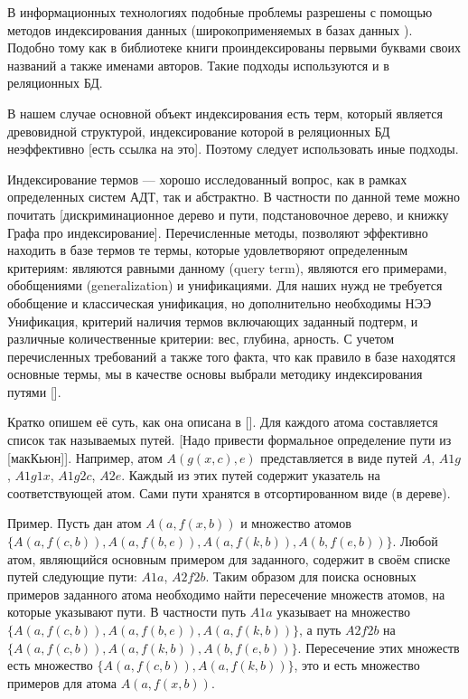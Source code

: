 В информационных технологиях подобные проблемы разрешены с помощью методов индексирования данных (широкоприменяемых в базах данных \cite{Ulman}). Подобно тому как в библиотеке книги проиндексированы первыми буквами своих названий а также именами авторов. Такие подходы используются и в реляционных БД.

В нашем случае основной объект индексирования есть терм, который является древовидной структурой, индексирование которой в реляционных БД неэффективно [есть ссылка на это]. Поэтому следует использовать иные подходы.

Индексирование термов --- хорошо исследованный вопрос, как в рамках определенных систем АДТ, так и абстрактно. В частности по данной теме можно почитать [дискриминационное дерево и пути, подстановочное дерево, и книжку Графа про индексирование].
Перечисленные методы, позволяют эффективно находить в базе термов те термы, которые удовлетворяют определенным критериям: являются равными данному (query term), являются его примерами, обобщениями (generalization) и унификациями.
Для наших нужд не требуется обобщение и классическая унификация, но дополнительно необходимы НЭЭ Унификация, критерий наличия термов включающих заданный подтерм, и различные количественные критерии: вес, глубина, арность. С учетом перечисленных требований а также того факта, что как правило в базе находятся основные термы, мы в качестве основы выбрали методику индексирования путями [].

Кратко опишем её суть, как она описана в []. Для каждого атома составляется список так называемых путей. [Надо привести формальное определение пути из [макКьюн]]. Например, атом $A(g(x,c),e)$ представляется в виде путей $A$, $A1g$, $A1g1x$, $A1g2c$, $A2e$. Каждый из этих путей содержит указатель на соответствующей атом. Сами пути хранятся в отсортированном виде (в дереве).

Пример. Пусть дан атом $A(a,f(x,b))$ и множество атомов $\{A(a,f(c,b)), A(a,f(b,e)),A(a,f(k,b)), A(b,f(e,b))\}$. Любой атом, являющийся основным примером для заданного, содержит в своём списке путей следующие пути: $A1a$, $A2f2b$. Таким образом для поиска основных примеров заданного атома необходимо найти пересечение множеств атомов, на которые указывают пути.  В частности путь $A1a$ указывает на множество $\{A(a,f(c,b)), A(a,f(b,e)),A(a,f(k,b))\}$, а путь $A2f2b$ на $\{A(a,f(c,b)), A(a,f(k,b)), A(b,f(e,b))\}$. Пересечение этих множеств есть множество $\{A(a,f(c,b)),A(a,f(k,b))\}$, это и есть множество примеров для атома $A(a,f(x,b))$.

